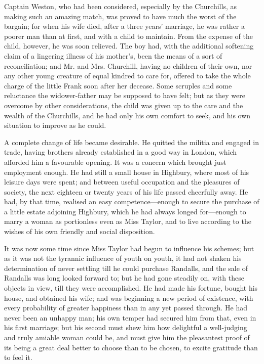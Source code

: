 Captain Weston, who had been considered, especially by the Churchills, as making such an amazing match, was proved to have much the worst of the bargain; for when his wife died, after a three years' marriage, he was rather a poorer man than at first, and with a child to maintain. From the expense of the child, however, he was soon relieved. The boy had, with the additional softening claim of a lingering illness of his mother's, been the means of a sort of reconciliation; and Mr. and Mrs. Churchill, having no children of their own, nor any other young creature of equal kindred to care for, offered to take the whole charge of the little Frank soon after her decease. Some scruples and some reluctance the widower-father may be supposed to have felt; but as they were overcome by other considerations, the child was given up to the care and the wealth of the Churchills, and he had only his own comfort to seek, and his own situation to improve as he could.

A complete change of life became desirable. He quitted the militia and engaged in trade, having brothers already established in a good way in London, which afforded him a favourable opening. It was a concern which brought just employment enough. He had still a small house in Highbury, where most of his leisure days were spent; and between useful occupation and the pleasures of society, the next eighteen or twenty years of his life passed cheerfully away. He had, by that time, realised an easy competence---enough to secure the purchase of a little estate adjoining Highbury, which he had always longed for---enough to marry a woman as portionless even as Miss Taylor, and to live according to the wishes of his own friendly and social disposition.

It was now some time since Miss Taylor had begun to influence his schemes; but as it was not the tyrannic influence of youth on youth, it had not shaken his determination of never settling till he could purchase Randalls, and the sale of Randalls was long looked forward to; but he had gone steadily on, with these objects in view, till they were accomplished. He had made his fortune, bought his house, and obtained his wife; and was beginning a new period of existence, with every probability of greater happiness than in any yet passed through. He had never been an unhappy man; his own temper had secured him from that, even in his first marriage; but his second must shew him how delightful a well-judging and truly amiable woman could be, and must give him the pleasantest proof of its being a great deal better to choose than to be chosen, to excite gratitude than to feel it.

